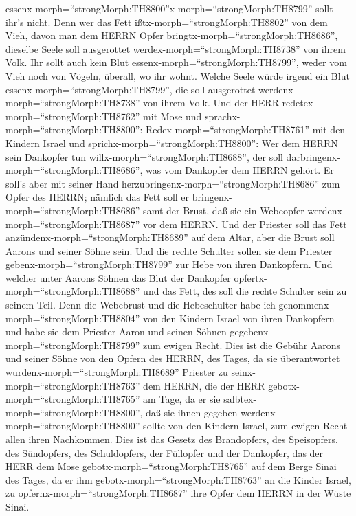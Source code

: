 essenx-morph=``strongMorph:TH8800''x-morph=``strongMorph:TH8799'' sollt
ihr's nicht.  Denn wer das Fett
ißtx-morph=``strongMorph:TH8802'' von dem Vieh, davon man dem HERRN
Opfer bringtx-morph=``strongMorph:TH8686'', dieselbe Seele soll
ausgerottet werdex-morph=``strongMorph:TH8738'' von ihrem Volk.
 Ihr sollt auch kein Blut
essenx-morph=``strongMorph:TH8799'', weder vom Vieh noch von Vögeln,
überall, wo ihr wohnt.  Welche Seele würde irgend ein Blut
essenx-morph=``strongMorph:TH8799'', die soll ausgerottet
werdenx-morph=``strongMorph:TH8738'' von ihrem Volk.  Und
der HERR redetex-morph=``strongMorph:TH8762'' mit Mose und
sprachx-morph=``strongMorph:TH8800'': 
Redex-morph=``strongMorph:TH8761'' mit den Kindern Israel und
sprichx-morph=``strongMorph:TH8800'': Wer dem HERRN sein Dankopfer tun
willx-morph=``strongMorph:TH8688'', der soll
darbringenx-morph=``strongMorph:TH8686'', was vom Dankopfer dem HERRN
gehört.  Er soll's aber mit seiner Hand
herzubringenx-morph=``strongMorph:TH8686'' zum Opfer des HERRN; nämlich
das Fett soll er bringenx-morph=``strongMorph:TH8686'' samt der Brust,
daß sie ein Webeopfer werdenx-morph=``strongMorph:TH8687'' vor dem
HERRN.  Und der Priester soll das Fett
anzündenx-morph=``strongMorph:TH8689'' auf dem Altar, aber die Brust
soll Aarons und seiner Söhne sein.  Und die rechte Schulter
sollen sie dem Priester gebenx-morph=``strongMorph:TH8799'' zur Hebe von
ihren Dankopfern.  Und welcher unter Aarons Söhnen das Blut
der Dankopfer opfertx-morph=``strongMorph:TH8688'' und das Fett, des
soll die rechte Schulter sein zu seinem Teil.  Denn die
Webebrust und die Hebeschulter habe ich
genommenx-morph=``strongMorph:TH8804'' von den Kindern Israel von ihren
Dankopfern und habe sie dem Priester Aaron und seinen Söhnen
gegebenx-morph=``strongMorph:TH8799'' zum ewigen Recht. 
Dies ist die Gebühr Aarons und seiner Söhne von den Opfern des HERRN,
des Tages, da sie überantwortet wurdenx-morph=``strongMorph:TH8689''
Priester zu seinx-morph=``strongMorph:TH8763'' dem HERRN, 
die der HERR gebotx-morph=``strongMorph:TH8765'' am Tage, da er sie
salbtex-morph=``strongMorph:TH8800'', daß sie ihnen gegeben
werdenx-morph=``strongMorph:TH8800'' sollte von den Kindern Israel, zum
ewigen Recht allen ihren Nachkommen.  Dies ist das Gesetz
des Brandopfers, des Speisopfers, des Sündopfers, des Schuldopfers, der
Füllopfer und der Dankopfer,  das der HERR dem Mose
gebotx-morph=``strongMorph:TH8765'' auf dem Berge Sinai des Tages, da er
ihm gebotx-morph=``strongMorph:TH8763'' an die Kinder Israel, zu
opfernx-morph=``strongMorph:TH8687'' ihre Opfer dem HERRN in der Wüste
Sinai.


